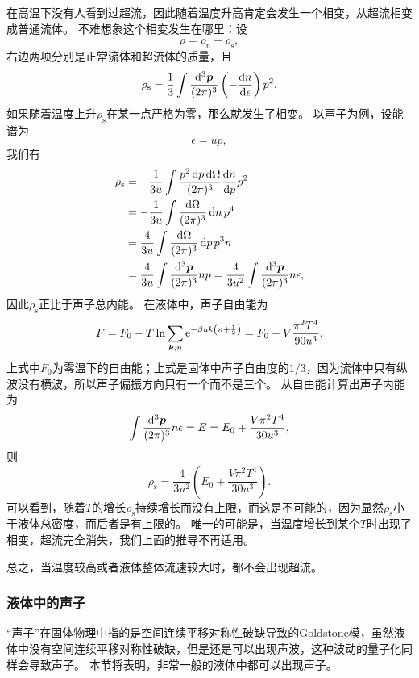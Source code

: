 \documentclass[hyperref, UTF8, a4paper]{ctexart}
\newcommand*{\ee}{\mathrm{e}}
\begin{document}
在高温下没有人看到过超流，因此随着温度升高肯定会发生一个相变，从超流相变成普通流体。
不难想象这个相变发生在哪里：设
\[
    \rho = \rho_\text{n} + \rho_\text{s},
\]
右边两项分别是正常流体和超流体的质量，且
\begin{equation}
    \rho_\text{s} = \frac{1}{3} \int \frac{\dd[3]{\vb*{p}}}{(2\pi)^3} \left( - \dv{n}{\epsilon} \right) p^2,
\end{equation}
如果随着温度上升$\rho_\text{s}$在某一点严格为零，那么就发生了相变。
以声子为例，设能谱为
\[
    \epsilon = u p,
\]
我们有
\[
    \begin{aligned}
        \rho_\text{s} &= - \frac{1}{3u} \int \frac{p^2 \dd{p} \dd{\Omega}}{(2\pi)^3} \dv{n}{p} p^2 \\
        &= - \frac{1}{3u} \int \frac{\dd{\Omega}}{(2\pi)^3} \dd{n} p^4 \\
        &= \frac{4}{3u} \int \frac{\dd\Omega}{(2\pi)^3} \dd{p} p^3 n \\
        &= \frac{4}{3u} \int \frac{\dd[3]{\vb*{p}}}{(2\pi)^3} n p = \frac{4}{3u^2} \int \frac{\dd[3]{\vb*{p}}}{(2\pi)^3} n \epsilon,
    \end{aligned}
\]
因此$\rho_\text{s}$正比于声子总内能。
在液体中，声子自由能为
\[
    F = F_0 - T \ln \sum_{\vb*{k}, n} \ee^{-\beta u k \left( n + \frac{1}{2} \right) } = F_0 - V \frac{\pi^2 T^4}{90 u^3},
\]
上式中$F_0$为零温下的自由能；上式是固体中声子自由度的$1/3$，因为流体中只有纵波没有横波，所以声子偏振方向只有一个而不是三个。
从自由能计算出声子内能为
\[
    \int \frac{\dd[3]{\vb*{p}}}{(2\pi)^3} n \epsilon = E = E_0 + \frac{V \pi^2 T^4}{30 u^3},
\]
则
\[
    \rho_\text{s} = \frac{4}{3u^2} \left( E_0 + \frac{V \pi^2 T^4}{30 u^3} \right).
\]
可以看到，随着$T$的增长$\rho_\text{s}$持续增长而没有上限，而这是不可能的，因为显然$\rho_\text{s}$小于液体总密度，而后者是有上限的。
唯一的可能是，当温度增长到某个$T$时出现了相变，超流完全消失，我们上面的推导不再适用。

总之，当温度较高或者液体整体流速较大时，都不会出现超流。

\subsubsection{液体中的声子}

“声子”在固体物理中指的是空间连续平移对称性破缺导致的Goldstone模，虽然液体中没有空间连续平移对称性破缺，但是还是可以出现声波，这种波动的量子化同样会导致声子。
本节将表明，非常一般的液体中都可以出现声子。
\end{document}
